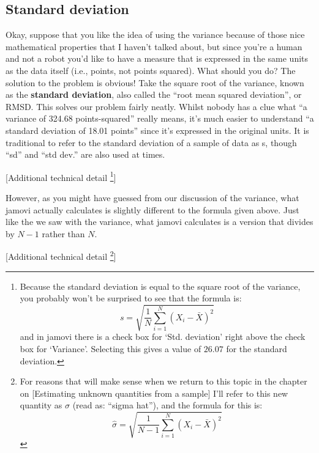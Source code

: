 \documentclass[
]{book}
\begin{document}
\hypertarget{standard-deviation}{%
\subsection{Standard deviation}\label{standard-deviation}}

Okay, suppose that you like the idea of using the variance because of those nice mathematical properties that I haven't talked about, but since you're a human and not a robot you'd like to have a measure that is expressed in the same units as the data itself (i.e., points, not points squared). What should you do? The solution to the problem is obvious! Take the square root of the variance, known as the \textbf{standard deviation}, also called the ``root mean squared deviation'', or RMSD. This solves our problem fairly neatly. Whilst nobody has a clue what ``a variance of 324.68 points-squared'' really means, it's much easier to understand ``a standard deviation of 18.01 points'' since it's expressed in the original units. It is traditional to refer to the standard deviation of a sample of data as s, though ``sd'' and ``std dev.'' are also used at times.

{{[}Additional technical detail \footnote{Because the standard deviation is equal to the square root of the variance, you probably won't be surprised to see that the formula is: \[s=\sqrt{\frac{1}{N} \sum_{i=1}^{N} ( X_i - \bar{X} )^2 }\] and in jamovi there is a check box for `Std. deviation' right above the check box for `Variance'. Selecting this gives a value of \(26.07\) for the standard deviation.}{]}}

However, as you might have guessed from our discussion of the variance, what jamovi actually calculates is slightly different to the formula given above. Just like the we saw with the variance, what jamovi calculates is a version that divides by \(N - 1\) rather than \(N\).

{{[}Additional technical detail \footnote{For reasons that will make sense when we return to this topic in the chapter on {[}Estimating unknown quantities from a sample{]} I'll refer to this new quantity as \(\hat{\sigma}\) (read as: ``sigma hat''), and the formula for this is: \[\hat{\sigma}=\sqrt{\frac{1}{N-1} \sum_{i=1}^{N} ( X_i - \bar{X} )^2}\]}{]}}
\end{document}
